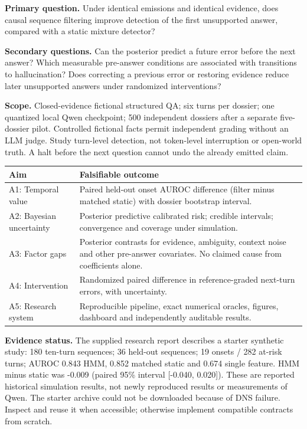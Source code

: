 \documentclass[11pt,letterpaper]{article}
\begin{document}
\textbf{Primary question.} Under identical emissions and identical evidence, does causal sequence filtering improve detection of the first unsupported answer, compared with a static mixture detector?

\textbf{Secondary questions.} Can the posterior predict a future error before the next answer? Which measurable pre-answer conditions are associated with transitions to hallucination? Does correcting a previous error or restoring evidence reduce later unsupported answers under randomized interventions?

\textbf{Scope.} Closed-evidence fictional structured QA; six turns per dossier; one quantized local Qwen checkpoint; 500 independent dossiers after a separate five-dossier pilot. Controlled fictional facts permit independent grading without an LLM judge. Study turn-level detection, not token-level interruption or open-world truth. A halt before the next question cannot undo the already emitted claim.


\begin{tabularx}{\linewidth}{p{.25\linewidth}X}
\toprule Aim & Falsifiable outcome \\ \midrule
A1: Temporal value & Paired held-out onset AUROC difference (filter minus matched static) with dossier bootstrap interval. \\
A2: Bayesian uncertainty & Posterior predictive calibrated risk; credible intervals; convergence and coverage under simulation. \\
A3: Factor gaps & Posterior contrasts for evidence, ambiguity, context noise and other pre-answer covariates. No claimed cause from coefficients alone. \\
A4: Intervention & Randomized paired difference in reference-graded next-turn errors, with uncertainty. \\
A5: Research system & Reproducible pipeline, exact numerical oracles, figures, dashboard and independently auditable results. \\ \bottomrule
\end{tabularx}

\textbf{Evidence status.} The supplied research report describes a starter synthetic study: 180 ten-turn sequences; 36 held-out sequences; 19 onsets / 282 at-risk turns; AUROC 0.843 HMM, 0.852 matched static and 0.674 single feature. HMM minus static was -0.009 (paired 95\% interval [-0.040, 0.020]). These are reported historical simulation results, not newly reproduced results or measurements of Qwen. The starter archive could not be downloaded because of DNS failure. Inspect and reuse it when accessible; otherwise implement compatible contracts from scratch.
\end{document}

